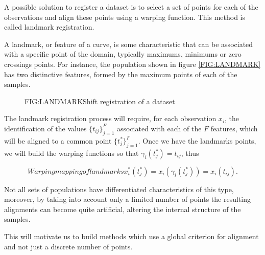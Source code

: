A possible solution to register a dataset is to select a set of points for each
of the observations and align these points using a warping function. This method
 is called landmark registration.

A landmark, or feature of a curve, is some characteristic that can be
associated with a specific point of the domain, typically maximums, minimums or
zero crossings points. For instance, the population shown in figure
\ref{FIG:LANDMARK} has two distinctive features, formed by the maximum points of
 each of the samples.


\begin{figure}[Shift registration of a dataset]{FIG:LANDMARK}{Shift registration of a dataset}
   \quad
\end{figure}


The landmark registration process will require, for each observation $x_i$,
the identification of the values $\{t_{ij}\}_{j=1}^{F}$ associated with each of
the $F$ features, which will be aligned to a common point
$\{t_{j}^*\}_{j=1}^{F}$. Once we have the landmarks points, we will build the
 warping functions so that $\gamma_i(t_j^*)=t_{ij}$, thus
 
\begin{equation}[]{Warping mapping of landmarks}
x_i^*(t_j^*) = x_i(\gamma_i(t_j^*)) = x_i(t_{ij}).
\end{equation}

Not all sets of populations have differentiated characteristics of this type,
moreover, by taking into account only a limited number of points the resulting
alignments can become quite artificial, altering the internal structure of the
samples.

This will motivate us to build methods which use a global criterion for
alignment and not just a discrete number of points.
